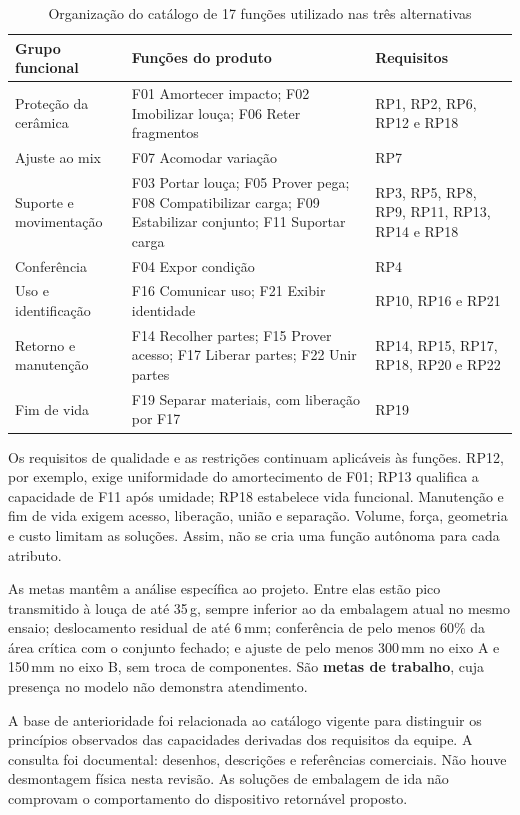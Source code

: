 \begin{table}[H]
\caption{Organização do catálogo de 17 funções utilizado nas três alternativas}
\centering\small
\begin{tabularx}{\textwidth}{L{3.8cm}YL{3.8cm}}
\toprule\textbf{Grupo funcional}&\textbf{Funções do produto}&\textbf{Requisitos}\\\midrule
Proteção da cerâmica&F01 Amortecer impacto; F02 Imobilizar louça; F06 Reter fragmentos&RP1, RP2, RP6, RP12 e RP18\\
Ajuste ao mix&F07 Acomodar variação&RP7\\
Suporte e movimentação&F03 Portar louça; F05 Prover pega; F08 Compatibilizar carga; F09 Estabilizar conjunto; F11 Suportar carga&RP3, RP5, RP8, RP9, RP11, RP13, RP14 e RP18\\
Conferência&F04 Expor condição&RP4\\
Uso e identificação&F16 Comunicar uso; F21 Exibir identidade&RP10, RP16 e RP21\\
Retorno e manutenção&F14 Recolher partes; F15 Prover acesso; F17 Liberar partes; F22 Unir partes&RP14, RP15, RP17, RP18, RP20 e RP22\\
Fim de vida&F19 Separar materiais, com liberação por F17&RP19\\\bottomrule
\end{tabularx}
\end{table}

Os requisitos de qualidade e as restrições continuam aplicáveis às funções. RP12, por exemplo, exige uniformidade do amortecimento de F01; RP13 qualifica a capacidade de F11 após umidade; RP18 estabelece vida funcional. Manutenção e fim de vida exigem acesso, liberação, união e separação. Volume, força, geometria e custo limitam as soluções. Assim, não se cria uma função autônoma para cada atributo.

As metas mantêm a análise específica ao projeto. Entre elas estão pico transmitido à louça de até 35\,g, sempre inferior ao da embalagem atual no mesmo ensaio; deslocamento residual de até 6\,mm; conferência de pelo menos 60\% da área crítica com o conjunto fechado; e ajuste de pelo menos 300\,mm no eixo A e 150\,mm no eixo B, sem troca de componentes. São \textbf{metas de trabalho}, cuja presença no modelo não demonstra atendimento.


A base de anterioridade foi relacionada ao catálogo vigente para distinguir os princípios observados das capacidades derivadas dos requisitos da equipe. A consulta foi documental: desenhos, descrições e referências comerciais. Não houve desmontagem física nesta revisão. As soluções de embalagem de ida não comprovam o comportamento do dispositivo retornável proposto.


